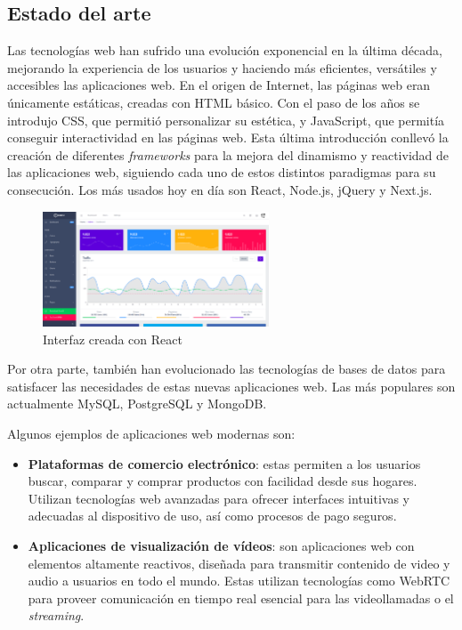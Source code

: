 \subsection{Estado del arte}

Las tecnologías web han sufrido una evolución exponencial en la última década, mejorando la experiencia de los usuarios y haciendo más eficientes, versátiles y accesibles las aplicaciones web. En el origen de Internet, las páginas web eran únicamente estáticas, creadas con HTML básico. Con el paso de los años se introdujo CSS, que permitió personalizar su estética, y JavaScript, que permitía conseguir interactividad en las páginas web. Esta última introducción conllevó la creación de diferentes \textit{frameworks} para la mejora del dinamismo y reactividad de las aplicaciones web, siguiendo cada uno de estos distintos paradigmas para su consecución. Los más usados hoy en día son React, Node.js, jQuery y Next.js.

\begin{figure}[H]
    \centering
    \includegraphics[width=0.6\textwidth]{figures/intro/react-ex.png}
    \caption{Interfaz creada con React}
    \label{fig:ejemplo}
\end{figure}

Por otra parte, también han evolucionado las tecnologías de bases de datos para satisfacer las necesidades de estas nuevas aplicaciones web. Las más populares son actualmente MySQL, PostgreSQL y MongoDB.

Algunos ejemplos de aplicaciones web modernas son:

\begin{itemize}
    \item \textbf{Plataformas de comercio electrónico}: estas permiten a los usuarios buscar, comparar y comprar productos con facilidad desde sus hogares. Utilizan tecnologías web avanzadas para ofrecer interfaces intuitivas y adecuadas al dispositivo de uso, así como procesos de pago seguros.

    \item \textbf{Aplicaciones de visualización de vídeos}: son aplicaciones web con elementos altamente reactivos, diseñada para transmitir contenido de video y audio a usuarios en todo el mundo. Estas utilizan tecnologías como WebRTC para proveer comunicación en tiempo real esencial para las videollamadas o el \textit{streaming}. 

\end{itemize}

